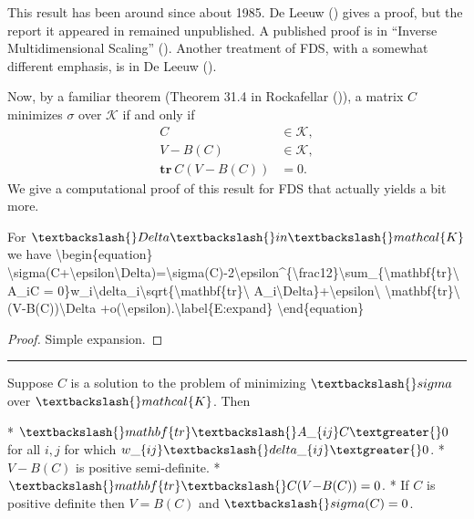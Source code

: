 \documentclass[
  12pt,
  letterpaper,
  DIV=11,
  numbers=noendperiod]{scrreprt}
\newenvironment{Shaded}{\begin{snugshade}}{\end{snugshade}}
\newcommand{\NormalTok}[1]{\textcolor[rgb]{0.00,0.23,0.31}{#1}}
\theoremstyle{remark}
\begin{document}
This result has been around since about 1985. De Leeuw
() gives a proof, but the report it
appeared in remained unpublished. A published proof is in {``{Inverse
Multidimensional Scaling}''}
(). Another treatment of FDS,
with a somewhat different emphasis, is in De Leeuw
().

Now, by a familiar theorem (Theorem 31.4 in Rockafellar
()), a matrix \(C\) minimizes
\(\sigma\) over \(\mathcal{K}\) if and only if \begin{align}
C&\in\mathcal{K},\\
V-B(C)&\in\mathcal{K},\\
\mathbf{tr}\ C(V-B(C))&=0.
\end{align} We give a computational proof of this result for FDS that
actually yields a bit more.

\begin{Shaded}
\begin{Highlighting}[]
\NormalTok{For $\textbackslash{}Delta\textbackslash{}in\textbackslash{}mathcal\{K\}$ we have}
\NormalTok{\textbackslash{}begin\{equation\}}
\NormalTok{\textbackslash{}sigma(C+\textbackslash{}epsilon\textbackslash{}Delta)=\textbackslash{}sigma(C){-}2\textbackslash{}epsilon\^{}\{\textbackslash{}frac12\}\textbackslash{}sum\_\{\textbackslash{}mathbf\{tr\}\textbackslash{} A\_iC = 0\}w\_i\textbackslash{}delta\_i\textbackslash{}sqrt\{\textbackslash{}mathbf\{tr\}\textbackslash{} A\_i\textbackslash{}Delta\}+\textbackslash{}epsilon\textbackslash{} \textbackslash{}mathbf\{tr\}\textbackslash{} (V{-}B(C))\textbackslash{}Delta}
\NormalTok{+o(\textbackslash{}epsilon).\textbackslash{}label\{E:expand\}}
\NormalTok{\textbackslash{}end\{equation\}}
\end{Highlighting}
\end{Shaded}

\begin{proof}
Simple expansion.
\end{proof}

\begin{center}\rule{0.5\linewidth}{0.5pt}\end{center}

\begin{Shaded}
\begin{Highlighting}[]
\NormalTok{Suppose $C$ is a solution to the problem of minimizing $\textbackslash{}sigma$ over $\textbackslash{}mathcal\{K\}$. Then}

\NormalTok{* $\textbackslash{}mathbf\{tr\}\textbackslash{} A\_\{ij\}C \textgreater{} 0$ for all $i,j$ for which $w\_\{ij\}\textbackslash{}delta\_\{ij\}\textgreater{}0$.}
\NormalTok{* $V{-}B(C)$ is positive semi{-}definite.}
\NormalTok{* $\textbackslash{}mathbf\{tr\}\textbackslash{} C(V{-}B(C))=0$.}
\NormalTok{* If $C$ is positive definite then $V=B(C)$ and $\textbackslash{}sigma(C)=0$.}
\end{Highlighting}
\end{Shaded}
\end{document}

